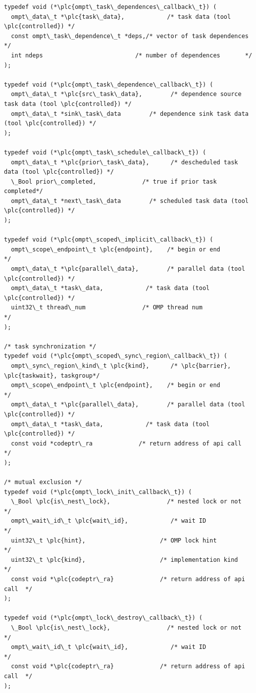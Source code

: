 \documentclass{article}
\begin{document}
\begin{boxedcode}
\begin{verbatim}
typedef void (*\plc{ompt\_task\_dependences\_callback\_t}) (                                   
  ompt\_data\_t *\plc{task\_data},            /* task data (tool \plc{controlled}) */
  const ompt\_task\_dependence\_t *deps,/* vector of task dependences  */
  int ndeps                          /* number of dependences       */
);

typedef void (*\plc{ompt\_task\_dependence\_callback\_t}) (
  ompt\_data\_t *\plc{src\_task\_data},        /* dependence source task data (tool \plc{controlled}) */
  ompt\_data\_t *sink\_task\_data        /* dependence sink task data (tool \plc{controlled}) */
);

typedef void (*\plc{ompt\_task\_schedule\_callback\_t}) (
  ompt\_data\_t *\plc{prior\_task\_data},      /* descheduled task data (tool \plc{controlled}) */
  \_Bool prior\_completed,             /* true if prior task completed*/
  ompt\_data\_t *next\_task\_data        /* scheduled task data (tool \plc{controlled}) */
);

typedef void (*\plc{ompt\_scoped\_implicit\_callback\_t}) ( 
  ompt\_scope\_endpoint\_t \plc{endpoint},    /* begin or end                */
  ompt\_data\_t *\plc{parallel\_data},        /* parallel data (tool \plc{controlled}) */
  ompt\_data\_t *task\_data,            /* task data (tool \plc{controlled}) */
  uint32\_t thread\_num                /* OMP thread num              */
);

/* task synchronization */
typedef void (*\plc{ompt\_scoped\_sync\_region\_callback\_t}) ( 
  ompt\_sync\_region\_kind\_t \plc{kind},      /* \plc{barrier}, \plc{taskwait}, taskgroup*/
  ompt\_scope\_endpoint\_t \plc{endpoint},    /* begin or end                */ 
  ompt\_data\_t *\plc{parallel\_data},        /* parallel data (tool \plc{controlled}) */
  ompt\_data\_t *task\_data,            /* task data (tool \plc{controlled}) */
  const void *codeptr\_ra             /* return address of api call  */
);

/* mutual exclusion */
typedef void (*\plc{ompt\_lock\_init\_callback\_t}) (
  \_Bool \plc{is\_nest\_lock},                /* nested lock or not          */
  ompt\_wait\_id\_t \plc{wait\_id},            /* wait ID                     */
  uint32\_t \plc{hint},                     /* OMP lock hint               */
  uint32\_t \plc{kind},                     /* implementation kind         */
  const void *\plc{codeptr\_ra}             /* return address of api call  */
);

typedef void (*\plc{ompt\_lock\_destroy\_callback\_t}) (
  \_Bool \plc{is\_nest\_lock},                /* nested lock or not          */
  ompt\_wait\_id\_t \plc{wait\_id},            /* wait ID                     */
  const void *\plc{codeptr\_ra}             /* return address of api call  */
);


\end{verbatim}
\end{boxedcode}
\end{document}
